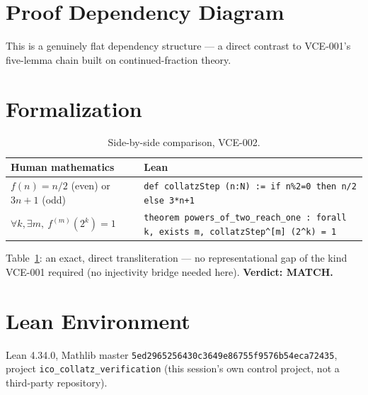 \documentclass[11pt]{article}
\begin{document}
\section{Proof Dependency Diagram}
\begin{center}
\end{center}
This is a genuinely flat dependency structure --- a direct contrast to VCE-001's five-lemma chain built on continued-fraction theory.

\section{Formalization}
\begin{table}[h]
\centering
\begin{tabular}{p{6.5cm}p{7cm}}
\toprule
Human mathematics & Lean \\
\midrule
$f(n)=n/2$ (even) or $3n+1$ (odd) & \texttt{def collatzStep (n:N) := if n\%2=0 then n/2 else 3*n+1} \\
$\forall k,\exists m,\ f^{(m)}(2^k)=1$ & \texttt{theorem powers\_of\_two\_reach\_one : forall k, exists m, collatzStep\^{}[m] (2\^{}k) = 1} \\
\bottomrule
\end{tabular}
\caption{Side-by-side comparison, VCE-002.}
\label{tab:sidebyside2}
\end{table}
Table~\ref{tab:sidebyside2}: an exact, direct transliteration --- no representational gap of the kind VCE-001 required (no injectivity bridge needed here). \textbf{Verdict: MATCH.}

\section{Lean Environment}
Lean 4.34.0, Mathlib master \texttt{5ed2965256430c3649e86755f9576b54eca72435}, project \texttt{ico\_collatz\_verification} (this session's own control project, not a third-party repository).
\end{document}
